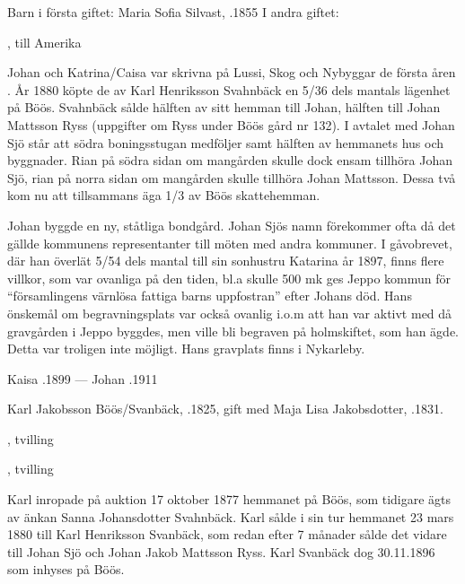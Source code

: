 Barn i första giftet: Maria Sofia Silvast, .1855
I andra giftet:
\begin{jhchildren}
  \item {}
  \item {}, till Amerika
  \item {}
\end{jhchildren}
Johan och Katrina/Caisa var skrivna på Lussi, Skog och Nybyggar de första åren . År 1880 köpte de av Karl Henriksson Svahnbäck en 5/36 dels mantals lägenhet på Böös. Svahnbäck sålde hälften av sitt hemman till Johan, hälften till Johan Mattsson Ryss (uppgifter om Ryss under Böös gård nr 132). I avtalet med Johan Sjö står att södra boningsstugan medföljer samt hälften av hemmanets hus och byggnader. Rian på södra sidan om mangården skulle dock ensam tillhöra Johan Sjö, rian på norra sidan om mangården skulle tillhöra Johan Mattsson. Dessa två kom nu att tillsammans äga 1/3 av Böös skattehemman.

Johan byggde en ny, ståtliga bondgård. Johan Sjös namn förekommer ofta då det gällde kommunens representanter till möten med andra kommuner. I gåvobrevet, där han överlät 5/54 dels mantal till sin sonhustru Katarina år 1897, finns flere villkor, som var ovanliga på den tiden, bl.a skulle 500 mk ges Jeppo kommun för ``församlingens värnlösa fattiga barns uppfostran'' efter Johans död. Hans önskemål om begravningsplats var också ovanlig i.o.m att han var aktivt med då gravgården i Jeppo byggdes, men ville bli begraven på holmskiftet, som han ägde. Detta var troligen inte möjligt. Hans gravplats finns i Nykarleby.

Kaisa .1899  ---  Johan .1911


%
Karl Jakobsson Böös/Svanbäck, .1825, gift med Maja Lisa Jakobsdotter, .1831.
\begin{jhchildren}
  \item {}, tvilling
  \item {}, tvilling
  \item {}
  \item {}
  \item {}
\end{jhchildren}
Karl inropade på auktion 17 oktober 1877 hemmanet på Böös, som tidigare ägts av änkan Sanna Johansdotter Svahnbäck. Karl sålde i sin tur hemmanet 23 mars 1880 till Karl Henriksson Svanbäck, som redan efter 7 månader sålde det vidare till Johan Sjö och Johan Jakob Mattsson Ryss. Karl Svanbäck dog 30.11.1896 som inhyses på Böös.


